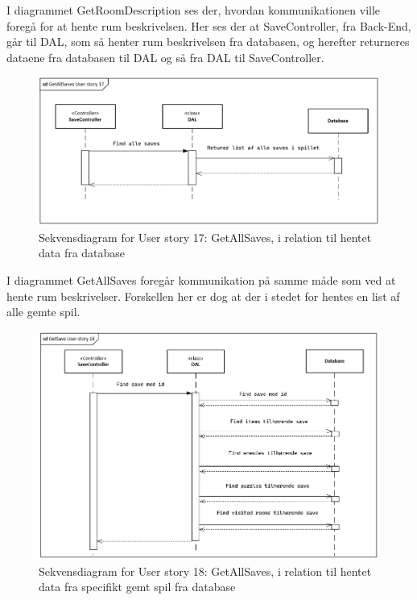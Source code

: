 I diagrammet GetRoomDescription ses der, hvordan kommunikationen ville foregå for at hente rum beskrivelsen. Her ses der at SaveController, fra Back-End, går til DAL, som så henter rum beskrivelsen fra databasen, og herefter returneres dataene fra databasen til DAL og så fra DAL til SaveController.

\begin{figure}[H]
\centering
\includegraphics[width = \textwidth]{02-Body/Images/GetAllSavesDB.PNG}
\caption{Sekvensdiagram for User story 17: GetAllSaves, i relation til hentet data fra database}
\label{fig:GetAllSavesDB}
\end{figure}

I diagrammet GetAllSaves foregår kommunikation på samme måde som ved at hente rum beskrivelser. Forskellen her er dog at der i stedet for hentes en list af alle gemte spil.

\begin{figure}[H]
\centering
\includegraphics[width = \textwidth]{02-Body/Images/GetSaveDB.PNG}
\caption{Sekvensdiagram for User story 18: GetAllSaves, i relation til hentet data fra specifikt gemt spil fra database}
\label{fig:GetSaveDB}
\end{figure}

